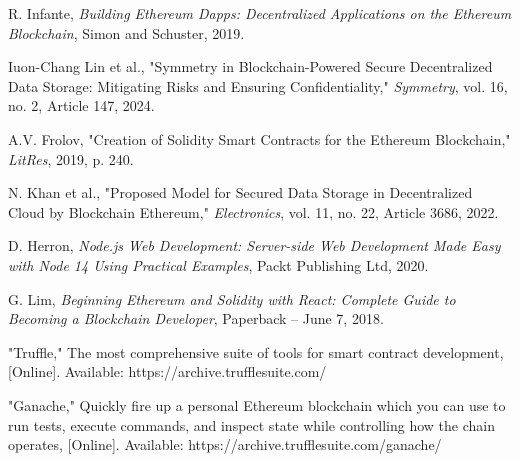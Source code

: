 \documentclass[10pt,conference,a4paper]{IEEEtran_EDM}
\begin{document}
\begin{thebibliography}{00}
 R. Infante, \textit{Building Ethereum Dapps: Decentralized Applications on the Ethereum Blockchain}, Simon and Schuster, 2019.

 Iuon-Chang Lin et al., "Symmetry in Blockchain-Powered Secure Decentralized Data Storage: Mitigating Risks and Ensuring Confidentiality," \textit{Symmetry}, vol. 16, no. 2, Article 147, 2024.

 A.V. Frolov, "Creation of Solidity Smart Contracts for the Ethereum Blockchain," \textit{LitRes}, 2019, p. 240.

 N. Khan et al., "Proposed Model for Secured Data Storage in Decentralized Cloud by Blockchain Ethereum," \textit{Electronics}, vol. 11, no. 22, Article 3686, 2022.

 D. Herron, \textit{Node.js Web Development: Server-side Web Development Made Easy with Node 14 Using Practical Examples}, Packt Publishing Ltd, 2020.

 G. Lim, \textit{Beginning Ethereum and Solidity with React: Complete Guide to Becoming a Blockchain Developer}, Paperback – June 7, 2018.

 "Truffle," The most comprehensive suite of tools for smart contract development, [Online]. Available: https://archive.trufflesuite.com/

 "Ganache," Quickly fire up a personal Ethereum blockchain which you can use to run tests, execute commands, and inspect state while controlling how the chain operates, [Online]. Available: https://archive.trufflesuite.com/ganache/

\end{thebibliography}
\end{document}
